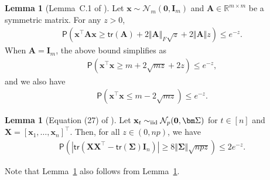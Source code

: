 \documentclass[11pt, a4paper]{article}
\newcommand{\mbf}{\mathbf}
\newcommand{\mc}{\mathcal}
\renewcommand{\l}{\left}
\renewcommand{\r}{\right}
\newcommand{\E}[0]{\mathsf{E}}
\newcommand{\tr}[0]{\mathsf{tr}}
\newcommand{\p}{\mathsf{P}}
\newcommand{\R}{\mathbb{R}}
\newcommand{\iid}{\text{\upshape iid}}
\theoremstyle{definition}
\theoremstyle{definition}
\theoremstyle{definition}
\newtheorem{lem}[thm]{Lemma}
\theoremstyle{definition}
\theoremstyle{definition}
\theoremstyle{remark}
\theoremstyle{definition}
\theoremstyle{definition}
\theoremstyle{definition}
\begin{document}
\begin{lem}[Lemma~C.1 of \citealp{VeGa18}] 
\label{lem:chisq}
Let $\mbf x \sim \mc N_m(\mbf 0, \mbf I_m)$ and $\mbf A \in \R^{m \times m}$ be a symmetric matrix.
For any $z > 0$,
\begin{align*}
\p\l( \mbf x^\top \mbf A \mbf x \ge \tr(\mbf A) + 2 \Vert \mbf A \Vert_F \sqrt{z} + 2 \Vert \mbf A \Vert z \r) \le e^{-z}.
\end{align*}
When $\mbf A = \mbf I_m$, the above bound simplifies as
\begin{align*}
\p( \mbf x^\top \mbf x \ge m + 2 \sqrt{mz} + 2z ) \le e^{-z},
\end{align*}
and we also have
\begin{align*}
\p( \mbf x^\top \mbf x \le m - 2 \sqrt{mz} ) \le e^{-z}.
\end{align*}
\end{lem}

\begin{lem}[Equation (27) of \citealp{VeGa18}] 
\label{lem:tr:xx}
Let $\mbf x_t \sim_{\iid} \mc N_p(\mbf 0, \bm \Sigma)$ for $t \in[n]$ and $ \mbf X = [\mbf x_1, \ldots, \mbf x_n]^\top$. Then, for all $z \in (0, np)$, we have
\begin{align*}
\p\l( \l\vert \tr\l(\mbf X\mbf X^\top - \tr(\bm\Sigma) \mbf I_n\r) \r\vert  \ge 8 \Vert \bm\Sigma \Vert \sqrt{npz} \r) \le 2 e^{-z}.
\end{align*}
\end{lem}
Note that Lemma~\ref{lem:tr:xx} also follows from Lemma~\ref{lem:chisq}.


\end{document}
